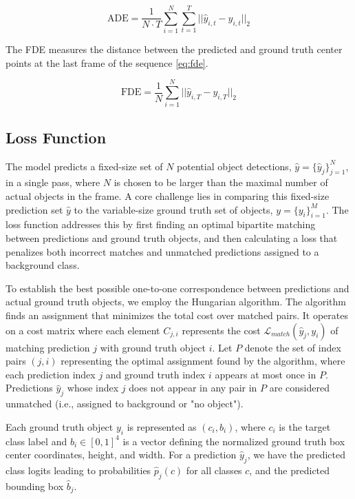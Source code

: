 \begin{equation}
    \text{ADE} = \frac{1}{N \cdot T} \sum_{i=1}^{N} \sum_{t=1}^{T} || \hat{y}_{i,t} - y_{i,t} ||_2
    \label{eq:ade}
\end{equation}

The FDE measures the distance between the predicted and ground truth center points at the last frame of the sequence \ref{eq:fde}.

\begin{equation}
    \text{FDE} = \frac{1}{N} \sum_{i=1}^{N} || \hat{y}_{i,T} - y_{i,T} ||_2
    \label{eq:fde}
\end{equation}

\subsection{Loss Function} \label{Methods:LossFunction}

The model predicts a fixed-size set of $N$ potential object detections, $ \hat{y} = \{\hat{y}_j\}_{j=1}^N $, in a single pass, where $N$ is chosen to be larger than the maximal number of actual objects in the frame. A core challenge lies in comparing this fixed-size prediction set $ \hat{y} $ to the variable-size ground truth set of objects, $ y = \{y_i\}_{i=1}^M $. The loss function addresses this by first finding an optimal bipartite matching between predictions and ground truth objects, and then calculating a loss that penalizes both incorrect matches and unmatched predictions assigned to a background class.

To establish the best possible one-to-one correspondence between predictions and actual ground truth objects, we employ the Hungarian algorithm. The algorithm finds an assignment that minimizes the total cost over matched pairs. It operates on a cost matrix where each element $ C_{j,i} $ represents the cost $ \mathcal{L}_{match}(\hat{y}_j, y_i) $ of matching prediction $ j $ with ground truth object $ i $. Let $ P $ denote the set of index pairs $ (j, i) $ representing the optimal assignment found by the algorithm, where each prediction index $ j $ and ground truth index $ i $ appears at most once in $ P $. Predictions $ \hat{y}_j $ whose index $ j $ does not appear in any pair in $ P $ are considered unmatched (i.e., assigned to background or "no object").

Each ground truth object $ y_i $ is represented as $ (c_i, b_i) $, where $ c_i $ is the target class label and $ b_i \in [0, 1]^4 $ is a vector defining the normalized ground truth box center coordinates, height, and width. For a prediction $ \hat{y}_j $, we have the predicted class logits leading to probabilities $ \hat{p}_j(c) $ for all classes $ c $, and the predicted bounding box $ \hat{b}_j $.

